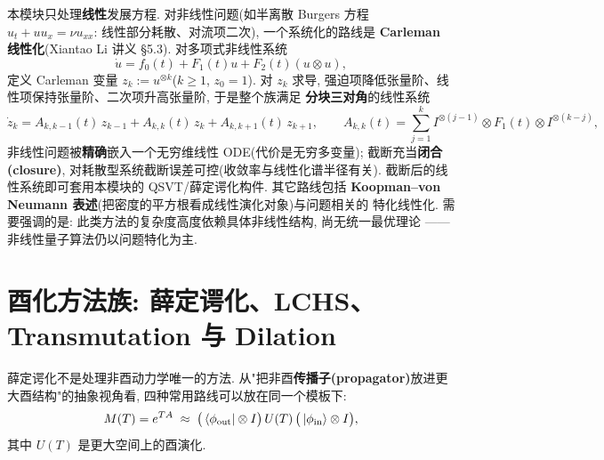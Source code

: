 \documentclass[utf8]{article} %
\numberwithin{equation}{section}   %
\newtheorem{Note}{\hskip 2em {\color{red} 注}}[subsection]
\begin{document}
\begin{Note}
    本模块只处理\textbf{线性}发展方程. 对非线性问题(如半离散 Burgers 方程
    $u_t + uu_x = \nu u_{xx}$: 线性部分耗散、对流项二次), 一个系统化的路线是
    \textbf{Carleman 线性化}(Xiantao Li 讲义 §5.3). 对多项式非线性系统
    \begin{equation}
        \dot u = f_0(t) + F_1(t)u + F_2(t)(u\otimes u),
    \end{equation}
    定义 Carleman 变量 $z_k := u^{\otimes k}$($k \ge 1$, $z_0 = 1$). 对 $z_k$ 求导,
    强迫项降低张量阶、线性项保持张量阶、二次项升高张量阶, 于是整个族满足
    \textbf{分块三对角}的线性系统
    \begin{equation}
        \dot z_k = A_{k,k-1}(t)\, z_{k-1} + A_{k,k}(t)\, z_k + A_{k,k+1}(t)\, z_{k+1},
        \qquad
        A_{k,k}(t) = \sum_{j=1}^{k} I^{\otimes(j-1)}\otimes F_1(t)\otimes I^{\otimes(k-j)},
    \end{equation}
    非线性问题被\textbf{精确}嵌入一个无穷维线性 ODE(代价是无穷多变量);
    截断充当\textbf{闭合(closure)}, 对耗散型系统截断误差可控(收敛率与线性化谱半径有关).
    截断后的线性系统即可套用本模块的 QSVT/薛定谔化构件. 其它路线包括
    \textbf{Koopman--von Neumann 表述}(把密度的平方根看成线性演化对象)与问题相关的
    特化线性化. 需要强调的是: 此类方法的复杂度高度依赖具体非线性结构, 尚无统一最优理论 ——
    非线性量子算法仍以问题特化为主.
\end{Note}

\section{酉化方法族: 薛定谔化、LCHS、Transmutation 与 Dilation}

薛定谔化不是处理非酉动力学唯一的方法. 从"把非酉\textbf{传播子(propagator)}放进更大酉结构"的抽象视角看,
四种常用路线可以放在同一个模板下:
\begin{equation}
    M(T) = e^{TA} \;\approx\;
    \big(\bra{\phi_{\mathrm{out}}}\otimes I\big)\,
    U(T)\,\big(\ket{\phi_{\mathrm{in}}}\otimes I\big),
\end{equation}
其中 $U(T)$ 是更大空间上的酉演化.
\end{document}
